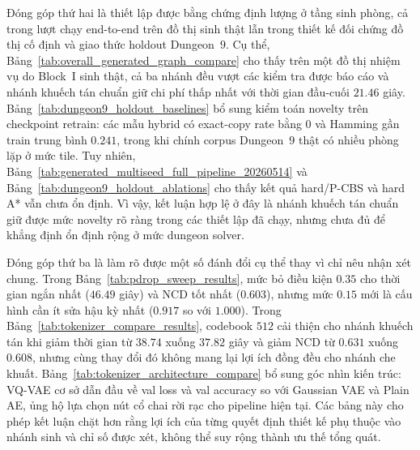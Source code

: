 \documentclass[oneside,a4paper,12pt]{extreport}
\begin{document}
Đóng góp thứ hai là thiết lập được bằng chứng định lượng ở tầng sinh phòng, cả trong lượt chạy end-to-end trên đồ thị sinh thật lẫn trong thiết kế đối chứng đồ thị cố định và giao thức holdout Dungeon~$9$. Cụ thể, Bảng~\ref{tab:overall_generated_graph_compare} cho thấy trên một đồ thị nhiệm vụ do Block~I sinh thật, cả ba nhánh đều vượt các kiểm tra được báo cáo và nhánh khuếch tán chuẩn giữ chi phí thấp nhất với thời gian đầu-cuối \textbf{$21.46$} giây. Bảng~\ref{tab:dungeon9_holdout_baselines} bổ sung kiểm toán novelty trên checkpoint retrain: các mẫu hybrid có exact-copy rate bằng $0$ và Hamming gần train trung bình \textbf{$0.241$}, trong khi chính corpus Dungeon~$9$ thật có nhiều phòng lặp ở mức tile. Tuy nhiên, Bảng~\ref{tab:generated_multiseed_full_pipeline_20260514} và Bảng~\ref{tab:dungeon9_holdout_ablations} cho thấy kết quả hard/P-CBS và hard A* vẫn chưa ổn định. Vì vậy, kết luận hợp lệ ở đây là nhánh khuếch tán chuẩn giữ được mức novelty rõ ràng trong các thiết lập đã chạy, nhưng chưa đủ để khẳng định ổn định rộng ở mức dungeon solver.

Đóng góp thứ ba là làm rõ được một số đánh đổi cụ thể thay vì chỉ nêu nhận xét chung. Trong Bảng~\ref{tab:pdrop_sweep_results}, mức bỏ điều kiện $0.35$ cho thời gian ngắn nhất (\textbf{$46.49$} giây) và NCD tốt nhất (\textbf{$0.603$}), nhưng mức $0.15$ mới là cấu hình cần ít sửa hậu kỳ nhất (\textbf{$0.917$} so với $1.000$). Trong Bảng~\ref{tab:tokenizer_compare_results}, codebook $512$ cải thiện cho nhánh khuếch tán khi giảm thời gian từ $38.74$ xuống \textbf{$37.82$} giây và giảm NCD từ $0.631$ xuống \textbf{$0.608$}, nhưng cùng thay đổi đó không mang lại lợi ích đồng đều cho nhánh che khuất. Bảng~\ref{tab:tokenizer_architecture_compare} bổ sung góc nhìn kiến trúc: VQ-VAE cơ sở dẫn đầu về val loss và val accuracy so với Gaussian VAE và Plain AE, ủng hộ lựa chọn nút cổ chai rời rạc cho pipeline hiện tại. Các bảng này cho phép kết luận chặt hơn rằng lợi ích của từng quyết định thiết kế phụ thuộc vào nhánh sinh và chỉ số được xét, không thể suy rộng thành ưu thế tổng quát.
\end{document}
